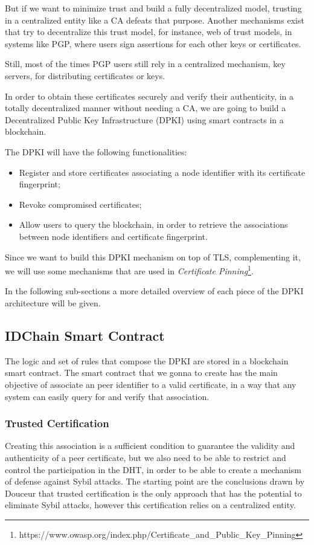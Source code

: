 But if we want to minimize trust and build a fully decentralized model, trusting in a centralized entity like a \ac{CA} defeats that purpose.
Another mechanisms exist that try to decentralize this trust model, for instance, web of trust models, in systems like \ac{PGP}, where users sign assertions for each other keys or certificates.

Still, most of the times \ac{PGP} users still rely in a centralized mechanism, key servers, for distributing certificates or keys.

In order to obtain these certificates securely and verify their authenticity, in a totally decentralized manner without needing a CA, we are going to build a Decentralized Public Key Infrastructure (DPKI) using smart contracts in a blockchain.

The DPKI will have the following functionalities:
\begin{itemize}
	\item Register and store certificates associating a node identifier with its certificate fingerprint;
	\item Revoke compromised certificates;
	\item Allow users to query the blockchain, in order to retrieve the associations between node identifiers and certificate fingerprint.
\end{itemize}

Since we want to build this DPKI mechanism on top of TLS, complementing it, we will use some mechanisms that are used in \textit{Certificate Pinning}\footnote{https://www.owasp.org/index.php/Certificate\_and\_Public\_Key\_Pinning}.

In the following sub-sections a more detailed overview of each piece of the \ac{DPKI} architecture will be given.

\subsection{IDChain Smart Contract}

The logic and set of rules that compose the \ac{DPKI} are stored in a blockchain smart contract.
The smart contract that we gonna to create has the main objective of associate an peer identifier to a valid certificate, in a way that any system can easily query for and verify that association.

\subsubsection{Trusted Certification}
Creating this association is a sufficient condition to guarantee the validity and authenticity of a peer certificate, but we also need to be able to restrict and control the participation in the \ac{DHT}, in order to be able to create a mechanism of defense against Sybil attacks.
The starting point are the conclusions drawn by Douceur\cite{Douceur2002} that trusted certification is the only approach that has the potential to eliminate Sybil attacks, however this certification relies on a centralized entity.

